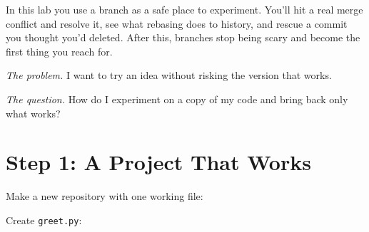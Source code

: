 
\begin{chapterintro}

In this lab you use a branch as a safe place to experiment. You'll hit a real merge conflict and resolve it, see what rebasing does to history, and rescue a commit you thought you'd deleted. After this, branches stop being scary and become the first thing you reach for.

\end{chapterintro}

\emph{The problem.} I want to try an idea without risking the version that works.

\emph{The question.} How do I experiment on a copy of my code and bring back only what works?


\section{Step 1: A Project That Works}\label{10-lab-try-an-idea-without-breaking-anything:step-1-a-project-that-works}

Make a new repository with one working file:

\begin{codeblock}

\begin{Shaded}
\begin{Highlighting}[]
 
\end{Highlighting}
\end{Shaded}

\end{codeblock}


Create \texttt{greet.py}:

\begin{codeblock}

\begin{Shaded}
\begin{Highlighting}[]
      \OperatorTok{+}\OperatorTok{+} 


\NormalTok{))}
\end{Highlighting}
\end{Shaded}

\end{codeblock}

